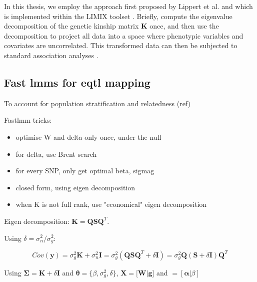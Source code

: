 In this thesis, we employ the approach first proposed by Lippert et al. \cite{lippert2014limix} and which is implemented within the LIMIX toolset \cite{lippert2014limix,casale2015efficient}. 
Briefly, \cite{lippert2014limix} compute the eigenvalue decomposition of the genetic kinship matrix $\mathbf{K}$ once, and then use the decomposition to project all data into a space where phenotypic variables and covariates are uncorrelated. 
This transformed data can then be subjected to standard association analyses \cite{lippert2014limix}.

\subsection{Fast \gls{lmm}s for e\gls{qtl} mapping}








To account for population stratification and relatedness (ref)

Fast\gls{lmm} tricks:
\begin{itemize}
    \item optimise W and delta only once, under the null
    \item for delta, use Brent search
    \item for every SNP, only get optimal beta, sigmag
    \item closed form, using eigen decomposition
    \item when K is not full rank, use "economical" eigen decomposition
\end{itemize}

Eigen decomposition: $\mathbf{K} = \mathbf{Q}\mathbf{S}\mathbf{Q}^T$.

Using $\delta = \sigma_n^2/\sigma_g^2$:

\begin{equation}\label{eq35}
 Cov(\mathbf{y}) = \sigma_g^2\mathbf{K} + \sigma_n^2\mathbf{I} = \sigma_g^2(\mathbf{Q}\mathbf{S}\mathbf{Q}^T + \delta\mathbf{I})= \sigma_g^2\mathbf{Q} (\mathbf{S} + \delta\mathbf{I})\mathbf{Q}^T
\end{equation}

Using $\boldsymbol{\Sigma} = \mathbf{K} + \delta\mathbf{I}$ and $\boldsymbol{\theta} = \{\beta, \sigma_g^2, \delta\}$, $\mathbf{X} = [\mathbf{W} | \mathbf{g}$] and $\boldsymbol = [\boldsymbol{\alpha} | \beta]$


